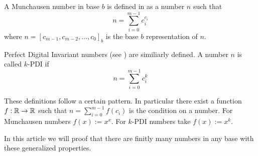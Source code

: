 A Munchausen number in base $b$ is defined in \cite{dvb} as a number $n$ such
that
\[
	n = \sum_{i=0}^{m-1} c_{i}^{c_{i}}
\]
where $n = [c_{m-1},c_{m-2},\ldots,c_{0}]_{b}$ is the base $b$ representation
of $n$.

Perfect Digital Invariant numbers (see \cite{wikipedia:pdi}) are similiarly
defined. A number $n$ is called $k$-PDI if
\[
	n = \sum_{i=0}^{m-1} c_{i}^{k}
\]

These definitions follow a certain pattern. In particular there exist a function
$f : \mathbb{R} \rightarrow \mathbb{R}$ such that $n = \sum_{i=0}^{m-1} f\left(c_{i}\right)$
is the condition on a number. For Munchausen numbers $f(x) := x^{x}$. For
$k$-PDI numbers take $f(x) := x^{k}$.

In this article we will proof that there are finitly many numbers in any base
with these generalized properties.
